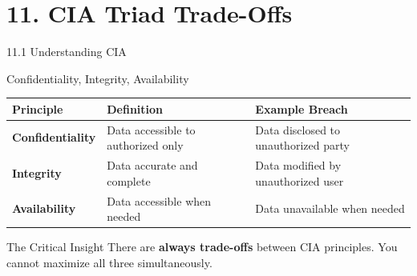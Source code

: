 \documentclass{beamer}
\begin{document}
	\section{11. CIA Triad Trade-Offs}
	
	\begin{frame}{11.1 Understanding CIA}
		\begin{block}{Confidentiality, Integrity, Availability}
			\begin{tabular}{|p{2.5cm}|p{4cm}|p{4.5cm}|}
				\hline
				\textbf{Principle} & \textbf{Definition} & \textbf{Example Breach} \\
				\hline
				\textbf{Confidentiality} & Data accessible to authorized only & Data disclosed to unauthorized party \\
				\hline
				\textbf{Integrity} & Data accurate and complete & Data modified by unauthorized user \\
				\hline
				\textbf{Availability} & Data accessible when needed & Data unavailable when needed \\
				\hline
			\end{tabular}
		\end{block}
		
		\begin{alertblock}{The Critical Insight}
			There are \textbf{always trade-offs} between CIA principles. You cannot maximize all three simultaneously.
		\end{alertblock}
	\end{frame}
	
\end{document}
